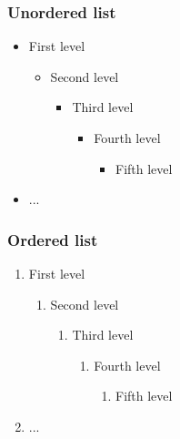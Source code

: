 \documentclass[t, xcolor=table, aspectratio=169]{beamer}
\begin{document}
    \begin{frame}
        \frametitle{Unordered list}
        \begin{itemize}
            \item First level
            \begin{itemize}
                \item Second level
                \begin{itemize}
                    \item Third level
                    \begin{itemize}
                        \item Fourth level
                        \begin{itemize}
                            \item Fifth level
                        \end{itemize}
                    \end{itemize}
                \end{itemize}
            \end{itemize}
            \item ...
        \end{itemize}
    \end{frame}

    \begin{frame}
        \frametitle{Ordered list}
        \begin{enumerate}
            \item First level
            \begin{enumerate}
                \item Second level
                \begin{enumerate}
                    \item Third level
                    \begin{enumerate}
                        \item Fourth level
                        \begin{enumerate}
                            \item Fifth level
                        \end{enumerate}
                    \end{enumerate}
                \end{enumerate}
            \end{enumerate}
            \item ...
        \end{enumerate}
    \end{frame}
\end{document}
